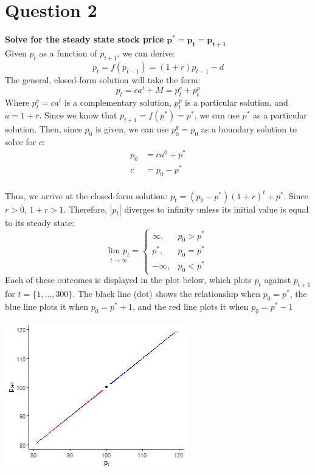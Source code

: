 \documentclass{article}
\begin{document}
\section*{Question 2}
\textbf{Solve for the steady state stock price} $\mathbf{p^*=p_t=p_{t+1}}$
\medskip \\
Given $p_t$ as a function of $p_{t+1}$, we can derive:
\[ 
	p_t = f(p_{t-1}) = (1+r)p_{t-1} - d 
\]
The general, closed-form solution will take the form:
\[
	p_t=c a^t + M = p_t^c + p_t^p
\]
Where $p_t^c=c a^t$ is a complementary solution, $p_t^p$ is a particular solution, and $a=1+r$. Since we know that $p_{t+1}=f(p^*)=p^*$, we can use $p^*$ as a particular solution. Then, since $p_0$ is given, we can use $p_0^g=p_0$ as a boundary solution to solve for $c$:
\begin{align*}
	p_0 &= c a^0 + p^* \\
	c   &= p_0 - p^*
\end{align*}
\smallskip \\
Thus, we arrive at the closed-form solution: $p_t=(p_0-p^*)(1+r)^t+p^*$. Since $r>0$, $1+r>1$. Therefore, $|p_t|$ diverges to infinity unless its initial value is equal to its steady state:
\[
	\underset{t\rightarrow\infty}{\text{lim }p_t} = \begin{cases}	\infty, & p_0 > p^* \\
																	p^*, 	& p_0 = p^* \\
																	-\infty,& p_0 < p^*
													\end{cases}
\]
Each of these outcomes is displayed in the plot below, which plots $p_t$ against $p_{t+1}$ for $t=\{1,...,300\}$. The black line (dot) shows the relationship when $p_0=p^*$, the blue line plots it when $p_0=p^*+1$, and the red line plots it when $p_0=p^*-1$
\begin{center}
\includegraphics[scale=1]{problem2_phaseplot.png}
\end{center}
\end{document}
